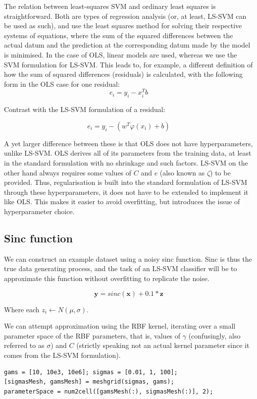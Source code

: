\documentclass[10pt,a4paper]{article}
\begin{document}
The relation between least-squares SVM and ordinary least squares is straightforward. Both are types of regression analysis (or, at least, LS-SVM can be used as such), and use the least squares method for solving their respective systems of equations, where the sum of the squared differences between the actual datum and the prediction at the corresponding datum made by the model is minimised. In the case of OLS, linear models are used, whereas we use the SVM formulation for LS-SVM. This leads to, for example, a different definition of how the sum of squared differences (residuals) is calculated, with the following form in the OLS case for one residual:
$$
e_i = y_i - x_i^T b
$$

Contrast with the LS-SVM formulation of a residual:

$$
e_i = y_i - (w^T\varphi(x_i) + b)
$$

A yet larger difference between these is that OLS does not have hyperparameters, unlike LS-SVM. OLS derives all of its parameters from the training data, at least in the standard formulation with no shrinkage and such factors. LS-SVM on the other hand always requires some values of $C$ and $e$ (also known as $\zeta$) to be provided. Thus, regularisation is built into the standard formulation of LS-SVM through these hyperparameters, it does not have to be extended to implement it like OLS. This makes it easier to avoid overfitting, but introduces the issue of hyperparameter choice.

\subsection{Sinc function}

We can construct an example dataset using a noisy sinc function. Sinc is thus the true data generating process, and the task of an LS-SVM classifier will be to approximate this function without overfitting to replicate the noise.

$$
\mathbf{y} = sinc(\mathbf{x}) + 0.1 * \mathbf{z}
$$

Where each $z_i \leftarrow N(\mu, \sigma)$.

We can attempt approximation using the RBF kernel, iterating over a small parameter space of the RBF parameters, that is, values of $\gamma$ (confusingly, also referred to as $\sigma$) and $C$ (strictly speaking not an actual kernel parameter since it comes from the LS-SVM formulation).

\begin{lstlisting}[style=Matlab-editor, frame=single]
gams = [10, 10e3, 10e6]; sigmas = [0.01, 1, 100];
[sigmasMesh, gamsMesh] = meshgrid(sigmas, gams);
parameterSpace = num2cell([gamsMesh(:), sigmasMesh(:)], 2);
\end{lstlisting}
\end{document}
